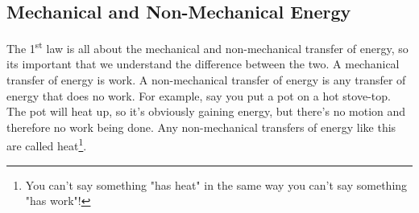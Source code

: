 \subsection{Mechanical and Non-Mechanical Energy}
The 1\textsuperscript{st} law is all about the mechanical and non-mechanical transfer of energy, so its important that we understand the difference between the two. A mechanical transfer of energy is work. A non-mechanical transfer of energy is any transfer of energy that does no work. For example, say you put a pot on a hot stove-top. The pot will heat up, so it's obviously gaining energy, but there's no motion and therefore no work being done. Any non-mechanical transfers of energy like this are called heat\footnote{You can't say something "has heat" in the same way you can't say something "has work"!}.